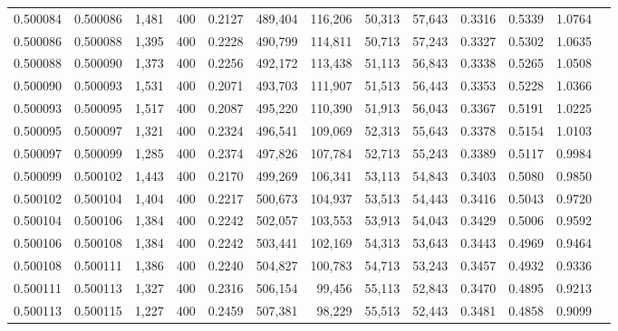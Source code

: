 \begin{tabular}{rrrrrrrrrrrrr}
0.500084 & 0.500086 &  1,481 & 400 &                                     0.2127 & 489,404 & 116,206 &  50,313 &  57,643 & 0.3316 & 0.5339 & 1.0764 \\
0.500086 & 0.500088 &  1,395 & 400 &                                     0.2228 & 490,799 & 114,811 &  50,713 &  57,243 & 0.3327 & 0.5302 & 1.0635 \\
0.500088 & 0.500090 &  1,373 & 400 &                                     0.2256 & 492,172 & 113,438 &  51,113 &  56,843 & 0.3338 & 0.5265 & 1.0508 \\
0.500090 & 0.500093 &  1,531 & 400 &                                     0.2071 & 493,703 & 111,907 &  51,513 &  56,443 & 0.3353 & 0.5228 & 1.0366 \\
0.500093 & 0.500095 &  1,517 & 400 &                                     0.2087 & 495,220 & 110,390 &  51,913 &  56,043 & 0.3367 & 0.5191 & 1.0225 \\
0.500095 & 0.500097 &  1,321 & 400 &                                     0.2324 & 496,541 & 109,069 &  52,313 &  55,643 & 0.3378 & 0.5154 & 1.0103 \\
0.500097 & 0.500099 &  1,285 & 400 &                                     0.2374 & 497,826 & 107,784 &  52,713 &  55,243 & 0.3389 & 0.5117 & 0.9984 \\
0.500099 & 0.500102 &  1,443 & 400 &                                     0.2170 & 499,269 & 106,341 &  53,113 &  54,843 & 0.3403 & 0.5080 & 0.9850 \\
0.500102 & 0.500104 &  1,404 & 400 &                                     0.2217 & 500,673 & 104,937 &  53,513 &  54,443 & 0.3416 & 0.5043 & 0.9720 \\
0.500104 & 0.500106 &  1,384 & 400 &                                     0.2242 & 502,057 & 103,553 &  53,913 &  54,043 & 0.3429 & 0.5006 & 0.9592 \\
0.500106 & 0.500108 &  1,384 & 400 &                                     0.2242 & 503,441 & 102,169 &  54,313 &  53,643 & 0.3443 & 0.4969 & 0.9464 \\
0.500108 & 0.500111 &  1,386 & 400 &                                     0.2240 & 504,827 & 100,783 &  54,713 &  53,243 & 0.3457 & 0.4932 & 0.9336 \\
0.500111 & 0.500113 &  1,327 & 400 &                                     0.2316 & 506,154 &  99,456 &  55,113 &  52,843 & 0.3470 & 0.4895 & 0.9213 \\
0.500113 & 0.500115 &  1,227 & 400 &                                     0.2459 & 507,381 &  98,229 &  55,513 &  52,443 & 0.3481 & 0.4858 & 0.9099 \\

\end{tabular}
